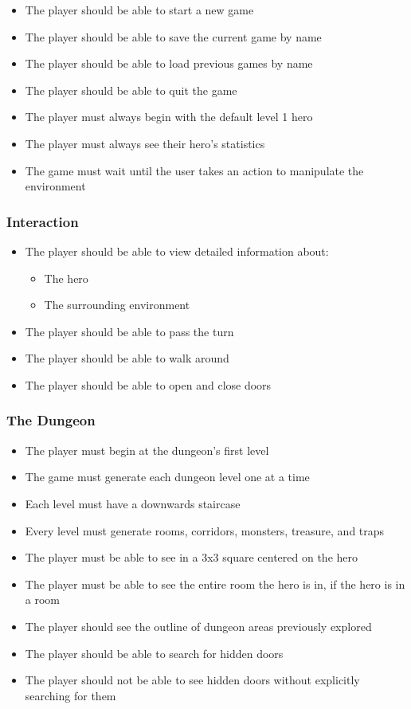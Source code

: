 \documentclass[12pt, titlepage]{article}
\begin{document}
		\begin{itemize}
			\item The player should be able to start a new game
			\item The player should be able to save the current game by name
			\item The player should be able to load previous games by name
			\item The player should be able to quit the game
			\item The player must always begin with the default level 1 hero
			\item The player must always see their hero's statistics
			\item The game must wait until the user takes an action to manipulate the environment
		\end{itemize}

		\subsubsection{Interaction}
		\begin{itemize}
			\item The player should be able to view detailed information about:
			\begin{itemize}
				\item The hero
				\item The surrounding environment
			\end{itemize}
			\item The player should be able to pass the turn
			\item The player should be able to walk around
			\item The player should be able to open and close doors
		\end{itemize}

		\subsubsection{The Dungeon}
			\begin{itemize}
				\item The player must begin at the dungeon's first level
				\item The game must generate each dungeon level one at a time
				\item Each level must have a downwards staircase
				\item Every level must generate rooms, corridors, monsters, treasure, and traps
				\item The player must be able to see in a 3x3 square centered on the hero
				\item The player must be able to see the entire room the hero is in, if the hero is in a room
				\item The player should see the outline of dungeon areas previously explored
				\item The player should be able to search for hidden doors
				\item The player should not be able to see hidden doors without explicitly searching for them
			\end{itemize}
\end{document}
